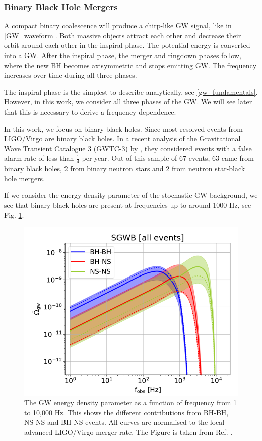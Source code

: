 \subsubsection{Binary Black Hole Mergers}
\label{BBH_mergers}

A compact binary coalescence will produce a chirp-like GW signal, like in \ref{GW_waveform}. Both massive objects attract each other and decrease their orbit around each other in the inspiral phase. The potential energy is converted into a GW. After the inspiral phase, the merger and ringdown phases follow, where the new BH becomes axisymmetric and stops emitting GW. The frequency increases over time during all three phases.

The inspiral phase is the simplest to describe analytically, see \ref{gw_fundamentals}. However, in this work, we consider all three phases of the GW. We will see later that this is necessary to derive a frequency dependence.


In this work, we focus on binary black holes. Since most resolved events from LIGO/Virgo are binary black holes. In a recent analysis of the Gravitational Wave Transient Catalogue 3 (GWTC-3) by \cite{the_ligo_scientific_collaboration_population_2022}, they considered events with a false alarm rate of less than $\frac{1}{4}$ per year. Out of this sample of 67 events, 63 came from binary black holes, 2 from binary neutron stars and 2 from neutron star-black hole mergers.

If we consider the energy density parameter of the stochastic GW background, we see that binary black holes are present at frequencies up to around 1000 Hz, see Fig. \ref{BG_sources}. 

\begin{figure}[h]
    \centering
    \includegraphics[width=0.7\linewidth]{Images/Capurri_GW_Background_monopole_sources.png}
    \caption{The GW energy density parameter as a function of frequency from 1 to 10,000 Hz. This shows the different contributions from BH-BH, NS-NS and BH-NS events. All curves are normalised to the local advanced LIGO/Virgo merger rate. The Figure is taken from Ref. \cite{capurri_intensity_2021}.} 
    \label{BG_sources}
\end{figure} 

